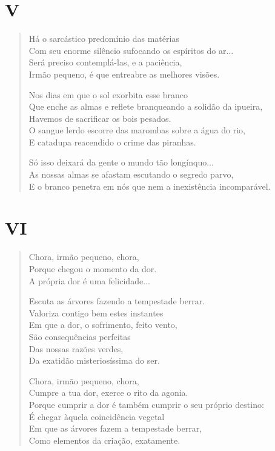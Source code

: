 \medskip
\section{V}

\begin{verse}
Há o sarcástico predomínio das matérias\\
Com seu enorme silêncio sufocando os espíritos do ar...\\
Será preciso contemplá-las, e a paciência,\\
Irmão pequeno, é que entreabre as melhores visões.

Nos dias em que o sol exorbita esse branco\\
Que enche as almas e reflete branqueando a solidão da ipueira,\\
Havemos de sacrificar os bois pesados.\\
O sangue lerdo escorre das marombas sobre a água do rio,\\
E catadupa reacendido o crime das piranhas.

Só isso deixará da gente o mundo tão longínquo...\\
As nossas almas se afastam escutando o segredo parvo,\\
E o branco penetra em nós que nem a inexistência incomparável.
\end{verse}

\medskip
\section{VI}

\begin{verse}
Chora, irmão pequeno, chora,\\
Porque chegou o momento da dor.\\
A própria dor é uma felicidade...

Escuta as árvores fazendo a tempestade berrar.\\
Valoriza contigo bem estes instantes\\
Em que a dor, o sofrimento, feito vento,\\
São consequências perfeitas\\
Das nossas razões verdes,\\
Da exatidão misteriosíssima do ser.

Chora, irmão pequeno, chora,\\
Cumpre a tua dor, exerce o rito da agonia.\\
Porque cumprir a dor é também cumprir o seu próprio destino:\\
É chegar àquela coincidência vegetal\\
Em que as árvores fazem a tempestade berrar,\\
Como elementos da criação, exatamente.
\end{verse}

